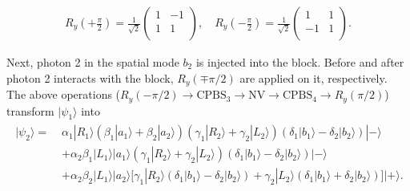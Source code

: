 \documentclass[showpacs,preprintnumbers,showkeys,amsmath,amssymb]{revtex4}%
\begin{document}
\begin{eqnarray}       \label{eq8}
R_y(+\frac{\pi}{2})=\frac{1}{\sqrt{2}}
\left( \begin{array}{cc}
1 & -1 \\
1 & 1 \\
 \end{array}
 \right),  \quad
 R_y(-\frac{\pi}{2})=\frac{1}{\sqrt{2}}
\left( \begin{array}{cc}
1 & 1 \\
-1 & 1 \\
 \end{array}
 \right).
\end{eqnarray}




Next, photon 2 in the spatial mode $b_2$ is injected into the block. Before and after photon 2 interacts with the block, $R_y(\mp\pi/2)$  are applied on it, respectively. The above operations ($ R_y(-\pi/2) \rightarrow \text{CPBS}_3 \rightarrow \text{NV} \rightarrow \text{CPBS}_4 \rightarrow R_y(\pi/2)$) transform $|\psi_1\rangle$ into
\begin{eqnarray}       \label{eq9}
\begin{split}
|\psi_2\rangle=\;&
\alpha_{1}|R_1\rangle(\beta_{1}|a_1\rangle+\beta_{2}|a_2\rangle)(\gamma_{1}|R_2\rangle + \gamma_{2}|L_2\rangle)(\delta_{1}|b_1\rangle - \delta_{2}|b_2\rangle)|-\rangle\\&
%
+\alpha_{2}\beta_{1}|L_1\rangle|a_1\rangle(\gamma_{1}|R_2\rangle + \gamma_{2}|L_2\rangle)(\delta_{1}|b_1\rangle - \delta_{2}|b_2\rangle)|-\rangle\\&
%
+\alpha_{2}\beta_{2}|L_1\rangle|a_2\rangle\big[\gamma_{1}|R_2\rangle (\delta_{1}|b_1\rangle - \delta_{2}|b_2\rangle)
                                               + \gamma_{2}|L_2\rangle (\delta_{1}|b_1\rangle + \delta_{2}|b_2\rangle)\big]|+\rangle.
\end{split}
\end{eqnarray}
\end{document}
